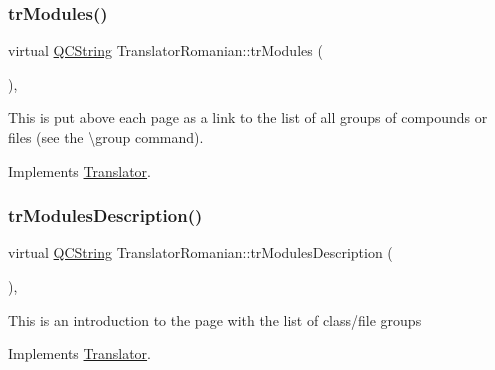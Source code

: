 \mbox{\label{class_translator_romanian_ac0d4575f79ec22ab5e4ab169cdeca88d}} 
\subsubsection{\texorpdfstring{trModules()}{trModules()}}
{\footnotesize\ttfamily virtual \mbox{\hyperlink{class_q_c_string}{Q\+C\+String}} Translator\+Romanian\+::tr\+Modules (\begin{DoxyParamCaption}{ }\end{DoxyParamCaption})\hspace{0.3cm}{\ttfamily [inline]}, {\ttfamily [virtual]}}

This is put above each page as a link to the list of all groups of compounds or files (see the \textbackslash{}group command). 

Implements \mbox{\hyperlink{class_translator}{Translator}}.

\mbox{\label{class_translator_romanian_a398cc6c94a03395ff0b9039c9f7c4f24}} 
\subsubsection{\texorpdfstring{trModulesDescription()}{trModulesDescription()}}
{\footnotesize\ttfamily virtual \mbox{\hyperlink{class_q_c_string}{Q\+C\+String}} Translator\+Romanian\+::tr\+Modules\+Description (\begin{DoxyParamCaption}{ }\end{DoxyParamCaption})\hspace{0.3cm}{\ttfamily [inline]}, {\ttfamily [virtual]}}

This is an introduction to the page with the list of class/file groups 

Implements \mbox{\hyperlink{class_translator}{Translator}}.

\mbox{\label{class_translator_romanian_ac1f3a2ccaf9bc8a17d17f757b39fa125}} 
